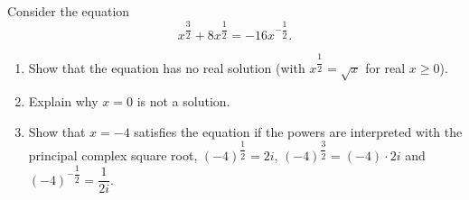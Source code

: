 Consider the equation
\[x^{\dfrac{3}{2}}+8x^{\dfrac{1}{2}}=-16x^{-\dfrac{1}{2}}.\]
\begin{enumerate}
\item[(a)] Show that the equation has no real solution (with $x^{\dfrac{1}{2}}=\sqrt x$ for real $x\ge0$).
\item[(b)] Explain why $x=0$ is not a solution.
\item[(c)] Show that $x=-4$ satisfies the equation if the powers are interpreted with the principal complex square root, $(-4)^{\dfrac{1}{2}}=2i$, $(-4)^{\dfrac{3}{2}}=(-4)\cdot2i$ and $(-4)^{-\dfrac{1}{2}}=\dfrac{1}{2i}$.
\end{enumerate}
